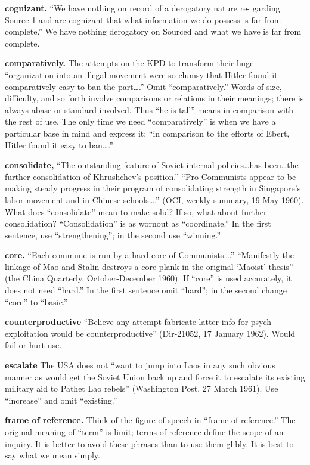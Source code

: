 \documentclass[
    oneside,
    11pt,
]{memoir}
\begin{document}
\textbf{cognizant.} \enquote{We have nothing on record of a derogatory nature re- garding Source-1 and are cognizant that what information we do possess is far from complete.} We have nothing derogatory on Sourced and what we have is far from complete.

\textbf{comparatively.} The attempts on the KPD to transform their huge \enquote{organization into an illegal movement were so clumsy that Hitler found it comparatively easy to ban the part\dots.} Omit \enquote{comparatively.} Words of size, difficulty, and so forth involve comparisons or relations in their meanings; there is always abase or standard involved. Thus \enquote{he is tall} means in comparison with the rest of use. The only time we need \enquote{comparatively} is when we have a particular base in mind and express it: \enquote{in comparison to the efforts of Ebert, Hitler found it easy to ban\dots.}

\textbf{consolidate,} \enquote{The outstanding feature of Soviet internal policies\dots has been\dots the further consolidation of Khrushchev's position.} \enquote{Pro-Communists appear to be making steady progress in their program of consolidating strength in Singapore's labor movement and in Chinese schools\dots.} (OCI, weekly summary, 19 May 1960). What does \enquote{consolidate} mean-to make solid? If so, what about further consolidation? \enquote{Consolidation} is as wornout as \enquote{coordinate.} In the first sentence, use \enquote{strengthening}; in the second use \enquote{winning.}

\textbf{core.} \enquote{Each commune is run by a hard core of Communists\dots.} \enquote{Manifestly the linkage of Mao and Stalin destroys a core plank in the original \enquote{Maoist} thesis} (the China Quarterly, October-December 1960). If \enquote{core} is used accurately, it does not need \enquote{hard.} In the first sentence omit \enquote{hard}; in the second change \enquote{core} to \enquote{basic.}

\textbf{counterproductive} \enquote{Believe any attempt fabricate latter info for psych exploitation would be counterproductive} (Dir-21052, 17 January 1962). Would fail or hurt use.

\textbf{escalate} The USA does not \enquote{want to jump into Laos in any such obvious manner as would get the Soviet Union back up and force it to escalate its existing military aid to Pathet Lao rebels} (Washington Post, 27 March 1961). Use \enquote{increase} and omit \enquote{existing.}

\textbf{frame of reference.} Think of the figure of speech in \enquote{frame of reference.} The original meaning of \enquote{term} is limit; terms of reference define the scope of an inquiry. It is better to avoid these phrases than to use them glibly. It is best to say what we mean simply.
\end{document}
